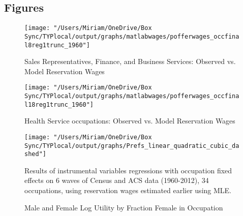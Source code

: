 \documentclass[12pt]{article}
\begin{document}
\subsection{Figures}



\begin{figure}[H]
\centering
\caption{Sales Representatives, Finance, and Business Services: Observed vs. Model Reservation Wages}
\label{sales}
\texttt{[image: "/Users/Miriam/OneDrive/Box Sync/TYPlocal/output/graphs/matlabwages/pofferwages\_occfinal8reg1trunc\_1960"]}
\end{figure}

\begin{figure}[H]
\centering
\caption{Health Service occupations: Observed vs. Model Reservation Wages}
\label{health}
\texttt{[image: "/Users/Miriam/OneDrive/Box Sync/TYPlocal/output/graphs/matlabwages/pofferwages\_occfinal18reg1trunc\_1960"]}
\end{figure}

\begin{figure}[H]
\caption{Male and Female Log Utility by Fraction Female in Occupation}
\label{prefs}
\begin{center}
\texttt{[image: "/Users/Miriam/OneDrive/Box Sync/TYPlocal/output/graphs/Prefs\_linear\_quadratic\_cubic\_dashed"]}
\begin{minipage}{.8\textwidth}
\begin{tablenotes}
\footnotesize
\item Results of instrumental variables regressions with occupation fixed effects on 6 waves of Census and ACS data (1960-2012), 34 occupations, using reservation wages estimated earlier using MLE.
\end{tablenotes}
\end{minipage}
\end{center}
\end{figure}
\end{document}
